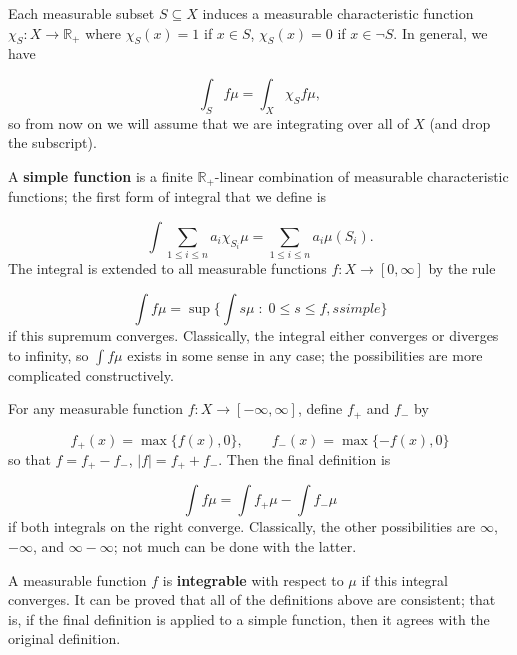 \documentclass[preprint, 5p, 10pt]{elsarticle}
\theoremstyle{plain}
\begin{document}
Each measurable subset $S \subseteq X$ induces a measurable characteristic function $\chi_S: X \to \mathbb{R}_+$ where $\chi_S(x) = 1$ if $x \in S$, $\chi_S(x) = 0$ if $x \in \neg{S}$. In general, we have

\begin{displaymath}
\int_S f \mu = \int_X \chi_S f \mu ,
\end{displaymath}
so from now on we will assume that we are integrating over all of $X$ (and drop the subscript).

A \textbf{simple function} is a finite $\mathbb{R}_+$-linear combination of measurable characteristic functions; the first form of integral that we define is

\begin{displaymath}
\int \sum_{1 \leq i \leq n} a_i \chi_{S_i} \mu = \sum_{1 \leq i \leq n} a_i \mu(S_i) .
\end{displaymath}
The integral is extended to all measurable functions $f: X \to [0, \infty]$ by the rule

\begin{displaymath}
\int f \mu = \sup \{\int s \mu \;:\; 0 \leq s \leq f, s simple\}
\end{displaymath}
if this supremum converges. Classically, the integral either converges or diverges to infinity, so $\int f \mu$ exists in some sense in any case; the possibilities are more complicated constructively.

For any measurable function $f: X \to [-\infty, \infty]$, define $f_+$ and $f_{-}$ by

\begin{displaymath}
f_+(x) = \max\{f(x), 0\}, \qquad f_{-}(x) = \max\{-f(x), 0\}
\end{displaymath}
so that $f = f_+ - f_{-}$, $|f| = f_+ + f_{-}$. Then the final definition is

\begin{displaymath}
\int f \mu = \int f_{+} \mu - \int f_{-} \mu
\end{displaymath}
if both integrals on the right converge. Classically, the other possibilities are $\infty$, $-\infty$, and $\infty - \infty$; not much can be done with the latter.

A measurable function $f$ is \textbf{integrable} with respect to $\mu$ if this integral converges. It can be proved that all of the definitions above are consistent; that is, if the final definition is applied to a simple function, then it agrees with the original definition.
\end{document}
